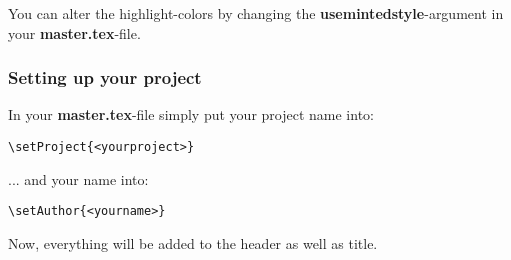 You can alter the highlight-colors by changing the \textbf{usemintedstyle{}}-argument in your \textbf{master.tex}-file.

\subsubsection{Setting up your project}
In your \textbf{master.tex}-file simply put your project name into: \\
 \begin{verbatim}\setProject{<yourproject>}\end{verbatim} 
... and your name into: \\
 \begin{verbatim}\setAuthor{<yourname>}\end{verbatim}
Now, everything will be added to the header as well as title.





